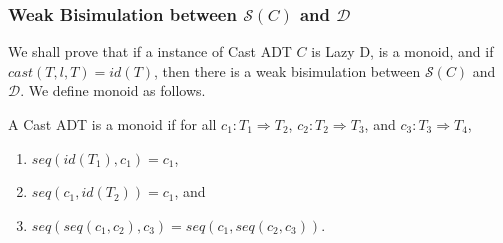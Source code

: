 \documentclass[acmsmall,review,anonymous]{acmart}\settopmatter{printfolios=true,printccs=false,printacmref=false}
\newcommand{\ineffCEKD}{$\mathcal{D}$}
\newcommand{\effCEK}[1]{$\mathcal{S}(#1)$}
\begin{document}
\subsubsection{Weak Bisimulation between \effCEK{C} and \ineffCEKD{}}

We shall prove that if a instance of Cast ADT $C$ is Lazy D, is a
monoid, and if $cast(T,l,T) = id(T)$, then there is
a weak bisimulation between \effCEK{C} and \ineffCEKD{}.
We define monoid as follows.

\begin{definition}[Monoid]
  A Cast ADT is a monoid if 
  for all
  $c_1 : T_1 \Longrightarrow T_2$,
  $c_2 : T_2 \Longrightarrow T_3$, and
  $c_3 : T_3 \Longrightarrow T_4$,
  \begin{enumerate}
    \item $seq(id(T_1),c_1) = c_1$,
    \item $seq(c_1,id(T_2)) = c_1$, and
    \item $seq(seq(c_1, c_2), c_3) = seq(c_1, seq(c_2, c_3))$.
  \end{enumerate}
\end{definition}


\end{document}

